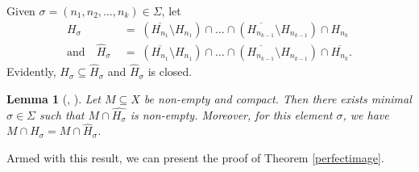 \documentclass[12pt,reqno]{amsart}
\newcommand{\cl}[1]{\ensuremath{\overline{{#1}}}}
\newtheorem{lem}[thm]{Lemma}
\theoremstyle{definition}
\begin{document}
Given $\sigma=(n_1,n_2,\dots,n_k) \in \Sigma$, let
\begin{align*}
H_\sigma &\;=\; (\cl{H_{n_1}}\setminus H_{n_1}) \cap \dots \cap (\cl{H_{n_{k-1}}}\setminus H_{n_{k-1}}) \cap H_{n_k}\\
\text{and}\quad \hat{H}_\sigma &\;=\; (\cl{H_{n_1}}\setminus H_{n_1}) \cap \dots \cap (\cl{H_{n_{k-1}}}\setminus H_{n_{k-1}}) \cap \cl{H_{n_k}}.
\end{align*}
Evidently, $H_\sigma \subseteq \hat{H}_\sigma$ and $\hat{H}_\sigma$ is closed.

\begin{lem}[{\cite[Lemma 3.6]{ks:15}, \cite[Lemma 3.3]{haydon:08}}]\label{minimal}
Let $M \subseteq X$ be non-empty and compact. Then there exists minimal $\sigma \in \Sigma$ such that $M \cap \hat{H_\sigma}$ is non-empty. Moreover, for this element $\sigma$, we have $M \cap H_\sigma = M \cap \hat{H}_\sigma$.
\end{lem}

Armed with this result, we can present the proof of Theorem \ref{perfectimage}.
\end{document}

